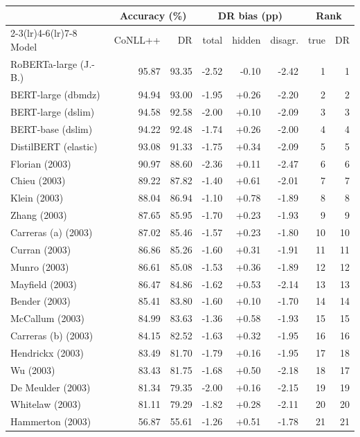 \begin{tabular}{lrrrrrrr}
\toprule
 & \multicolumn{2}{c}{Accuracy (\%)} & \multicolumn{3}{c}{DR bias (pp)} & \multicolumn{2}{c}{Rank} \\
\cmidrule(lr){2-3}\cmidrule(lr){4-6}\cmidrule(lr){7-8}
Model & CoNLL++ & DR & total & hidden & disagr. & true & DR \\
\midrule
RoBERTa-large (J.-B.) & 95.87 & 93.35 & -2.52 & -0.10 & -2.42 & 1 & 1 \\
BERT-large (dbmdz) & 94.94 & 93.00 & -1.95 & +0.26 & -2.20 & 2 & 2 \\
BERT-large (dslim) & 94.58 & 92.58 & -2.00 & +0.10 & -2.09 & 3 & 3 \\
BERT-base (dslim) & 94.22 & 92.48 & -1.74 & +0.26 & -2.00 & 4 & 4 \\
DistilBERT (elastic) & 93.08 & 91.33 & -1.75 & +0.34 & -2.09 & 5 & 5 \\
Florian (2003) & 90.97 & 88.60 & -2.36 & +0.11 & -2.47 & 6 & 6 \\
Chieu (2003) & 89.22 & 87.82 & -1.40 & +0.61 & -2.01 & 7 & 7 \\
Klein (2003) & 88.04 & 86.94 & -1.10 & +0.78 & -1.89 & 8 & 8 \\
Zhang (2003) & 87.65 & 85.95 & -1.70 & +0.23 & -1.93 & 9 & 9 \\
Carreras (a) (2003) & 87.02 & 85.46 & -1.57 & +0.23 & -1.80 & 10 & 10 \\
Curran (2003) & 86.86 & 85.26 & -1.60 & +0.31 & -1.91 & 11 & 11 \\
Munro (2003) & 86.61 & 85.08 & -1.53 & +0.36 & -1.89 & 12 & 12 \\
Mayfield (2003) & 86.47 & 84.86 & -1.62 & +0.53 & -2.14 & 13 & 13 \\
Bender (2003) & 85.41 & 83.80 & -1.60 & +0.10 & -1.70 & 14 & 14 \\
McCallum (2003) & 84.99 & 83.63 & -1.36 & +0.58 & -1.93 & 15 & 15 \\
Carreras (b) (2003) & 84.15 & 82.52 & -1.63 & +0.32 & -1.95 & 16 & 16 \\
Hendrickx (2003) & 83.49 & 81.70 & -1.79 & +0.16 & -1.95 & 17 & 18 \\
Wu (2003) & 83.43 & 81.75 & -1.68 & +0.50 & -2.18 & 18 & 17 \\
De Meulder (2003) & 81.34 & 79.35 & -2.00 & +0.16 & -2.15 & 19 & 19 \\
Whitelaw (2003) & 81.11 & 79.29 & -1.82 & +0.28 & -2.11 & 20 & 20 \\
Hammerton (2003) & 56.87 & 55.61 & -1.26 & +0.51 & -1.78 & 21 & 21 \\
\bottomrule
\end{tabular}
